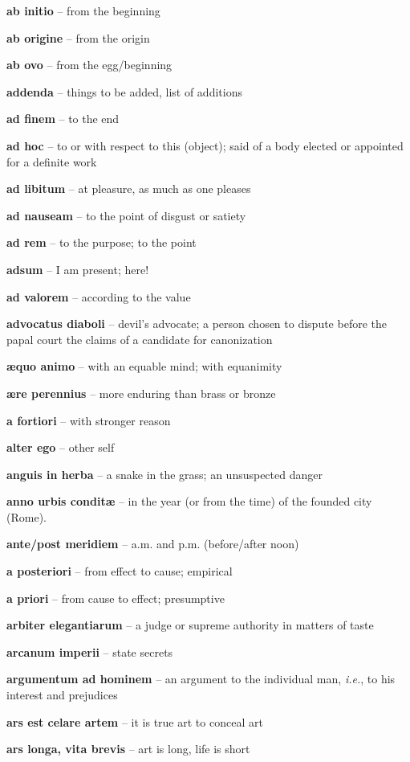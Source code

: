 \documentclass[12pt]{article}
\newcommand{\lat}[1]{\textbf{#1}}
\begin{document}
\lat{ab initio} -- from the beginning

\lat{ab origine} -- from the origin

\lat{ab ovo} -- from the egg/beginning

\lat{addenda} -- things to be added, list of additions

\lat{ad finem} -- to the end

\lat{ad hoc} -- to or with respect to this (object); said of a body elected or appointed for a definite work

\lat{ad libitum} -- at pleasure, as much as one pleases

\lat{ad nauseam} -- to the point of disgust or satiety

\lat{ad rem} -- to the purpose; to the point

\lat{adsum} -- I am present; here!

\lat{ad valorem} -- according to the value

\lat{advocatus diaboli} -- devil's advocate; a person chosen to dispute before the papal court the claims of a candidate for canonization

\lat{{\ae}quo animo} -- with an equable mind; with equanimity

\lat{\ae{re} perennius} -- more enduring than brass or bronze

\lat{a fortiori} -- with stronger reason

\lat{alter ego} -- other self

\lat{anguis in herba} -- a snake in the grass; an unsuspected danger

\lat{anno urbis condit\ae} -- in the year (or from the time) of the founded city (Rome).

\lat{ante/post meridiem} -- a.m. and p.m. (before/after noon)

\lat{a posteriori} -- from effect to cause; empirical

\lat{a priori} -- from cause to effect; presumptive

\lat{arbiter elegantiarum} -- a judge or supreme authority in matters of taste

\lat{arcanum imperii} -- state secrets

\lat{argumentum ad hominem} -- an argument to the individual man, \emph{i.e.}, to his interest and prejudices

\lat{ars est celare artem} -- it is true art to conceal art

\lat{ars longa, vita brevis} -- art is long, life is short
\end{document}
